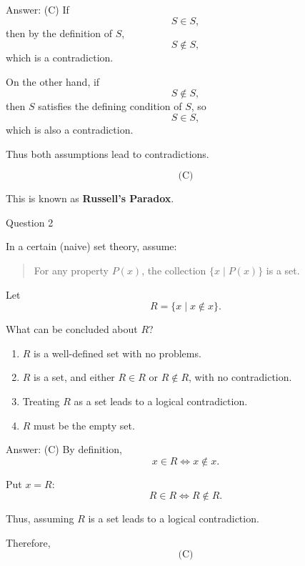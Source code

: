 \documentclass[aspectratio=169,11pt]{beamer}
\begin{document}
\begin{frame}

\begin{block}{Answer: (C)}
If
$$
S\in S,
$$
then by the definition of $S$,
$$
S\notin S,
$$
which is a contradiction.

On the other hand, if
$$
S\notin S,
$$
then $S$ satisfies the defining condition of $S$, so
$$
S\in S,
$$
which is also a contradiction.

Thus both assumptions lead to contradictions.

$$
\boxed{\text{(C)}}
$$

This is known as \textbf{Russell's Paradox}.
\end{block}

\end{frame}
\begin{frame}{Question 2}

In a certain (naive) set theory, assume:

\begin{quote}
For any property $P(x)$, the collection $\{x\mid P(x)\}$ is a set.
\end{quote}

Let
$$
R=\{x\mid x\notin x\}.
$$

What can be concluded about $R$?

\begin{enumerate}
    \item[(A)] $R$ is a well-defined set with no problems.
    \item[(B)] $R$ is a set, and either $R\in R$ or $R\notin R$, with no contradiction.
    \item[(C)] Treating $R$ as a set leads to a logical contradiction.
    \item[(D)] $R$ must be the empty set.
\end{enumerate}

\end{frame}

\begin{frame}

\begin{block}{Answer: (C)}
By definition,
$$
x\in R\iff x\notin x.
$$

Put $x=R$:
$$
R\in R\iff R\notin R.
$$

Thus, assuming $R$ is a set leads to a logical contradiction.

Therefore,
$$
\boxed{\text{(C)}}
$$
\end{block}

\end{frame}
\end{document}
